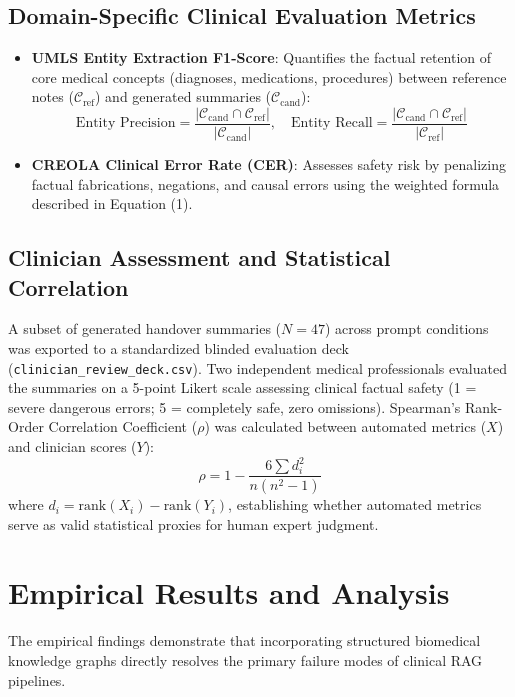 \documentclass[11pt, a4paper]{article}
\begin{document}
\subsection{Domain-Specific Clinical Evaluation Metrics}
\begin{itemize}
  \item \textbf{UMLS Entity Extraction F1-Score}: Quantifies the factual retention of core medical concepts (diagnoses, medications, procedures) between reference notes ($\mathcal{C}_{\text{ref}}$) and generated summaries ($\mathcal{C}_{\text{cand}}$):
  \begin{equation}
    \text{Entity Precision} = \frac{|\mathcal{C}_{\text{cand}} \cap \mathcal{C}_{\text{ref}}|}{|\mathcal{C}_{\text{cand}}|}, \quad \text{Entity Recall} = \frac{|\mathcal{C}_{\text{cand}} \cap \mathcal{C}_{\text{ref}}|}{|\mathcal{C}_{\text{ref}}|}
  \end{equation}
  \item \textbf{CREOLA Clinical Error Rate (CER)}: Assesses safety risk by penalizing factual fabrications, negations, and causal errors using the weighted formula described in Equation (1).
\end{itemize}

\subsection{Clinician Assessment and Statistical Correlation}
A subset of generated handover summaries ($N = 47$) across prompt conditions was exported to a standardized blinded evaluation deck (\texttt{clinician\_review\_deck.csv}). Two independent medical professionals evaluated the summaries on a 5-point Likert scale assessing clinical factual safety (1 = severe dangerous errors; 5 = completely safe, zero omissions). Spearman's Rank-Order Correlation Coefficient ($\rho$) was calculated between automated metrics ($X$) and clinician scores ($Y$):
\begin{equation}
  \rho = 1 - \frac{6 \sum d_i^2}{n(n^2 - 1)}
\end{equation}
where $d_i = \text{rank}(X_i) - \text{rank}(Y_i)$, establishing whether automated metrics serve as valid statistical proxies for human expert judgment.

\section{Empirical Results and Analysis}
The empirical findings demonstrate that incorporating structured biomedical knowledge graphs directly resolves the primary failure modes of clinical RAG pipelines.
\end{document}
